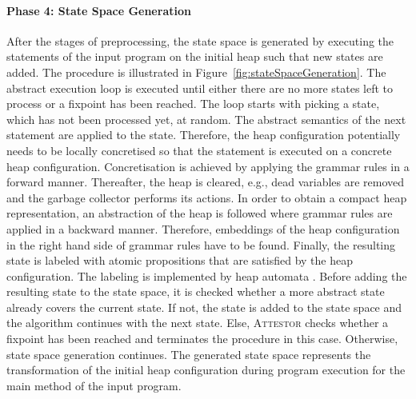 \documentclass[a4paper, 12pt, twoside]{report}
\begin{document}
	\paragraph{Phase 4: State Space Generation}	
	After the stages of preprocessing, the state space is generated by executing the statements of the input program on the initial heap such that new states are added. The procedure is illustrated in Figure~\ref{fig:stateSpaceGeneration}. The abstract execution loop is executed until either there are no more states left to process or a fixpoint has been reached. The loop starts with picking a state, which has not been processed yet, at random. The abstract semantics of the next statement are applied to the state. Therefore, the heap configuration potentially needs to be locally concretised so that the statement is executed on a concrete heap configuration. Concretisation is achieved by applying the grammar rules in a forward manner. Thereafter, the heap is cleared, e.g., dead variables are removed and the garbage collector performs its actions. In order to obtain a compact heap representation, an abstraction of the heap is followed where grammar rules are applied in a backward manner. Therefore, embeddings of the heap configuration in the right hand side of grammar rules have to be found. Finally, the resulting state is labeled with atomic propositions that are satisfied by the heap configuration. The labeling is implemented by heap automata \cite{arndt2018let}. Before adding the resulting state to the state space, it is checked whether a  more abstract state already covers the current state. If not, the state is added to the state space and the algorithm continues with the next state. Else, \textsc{Attestor} checks whether a fixpoint has been reached and terminates the procedure in this case. Otherwise, state space generation continues. The generated state space represents the transformation of the initial heap configuration during program execution for the main method of the input program.
	
\end{document}
